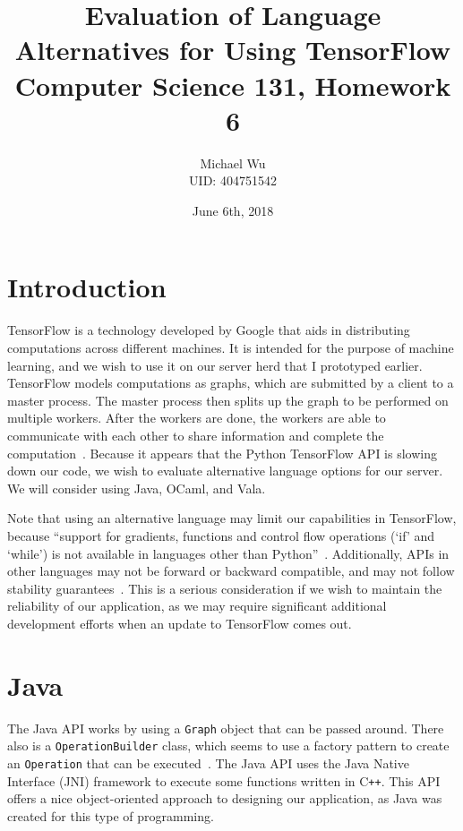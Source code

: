 \documentclass[letterpaper,twocolumn,10pt]{article}
\begin{document}
\title{\Large \bf Evaluation of Language Alternatives for Using TensorFlow\\
\normalsize Computer Science 131, Homework 6}
\author{Michael Wu\\UID: 404751542}
\date{June 6th, 2018}
\maketitle

\section{Introduction}

TensorFlow is a technology developed by Google that aids in distributing computations across different machines. It is intended
for the purpose of machine learning, and we wish to use it on our server herd that I prototyped earlier. TensorFlow models computations
as graphs, which are submitted by a client to a master process. The master process then splits up the graph to be performed on multiple
workers. After the workers are done, the workers are able to communicate with each other to share information and complete the
computation~\cite{tensorarch}. Because it appears that the Python TensorFlow API is slowing down our code, we wish to evaluate alternative
language options for our server. We will consider using Java, OCaml, and Vala.

Note that using an alternative language may limit our capabilities in TensorFlow, because ``support for gradients, functions and control
flow operations (`if' and `while') is not available in languages other than Python''~\cite{tensorbindings}. Additionally, APIs in
other languages may not be forward or backward compatible, and may not follow stability guarantees~\cite{tensorversion}. This is a serious
consideration if we wish to maintain the reliability of our application, as we may require significant additional development efforts when
an update to TensorFlow comes out.

\section{Java}

The Java API works by using a \texttt{Graph} object that can be passed around. There also is a \texttt{OperationBuilder} class, which
seems to use a factory pattern to create an \texttt{Operation} that can be executed~\cite{tensorjava}. The Java API uses the
Java Native Interface (JNI) framework to execute some functions written in C\texttt{++}. This API offers a nice object-oriented approach to designing
our application, as Java was created for this type of programming.
\end{document}
